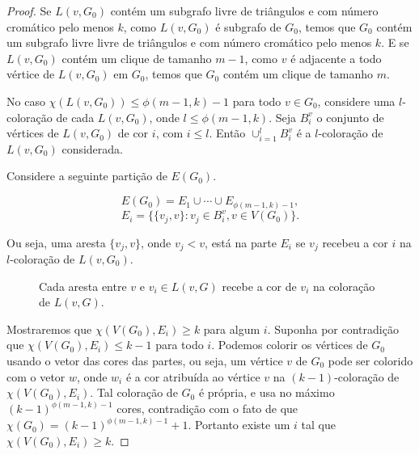\begin{proof}
Se $L(v, G_0)$ contém um subgrafo livre de triângulos e com número cromático pelo menos $k$, como $L(v,G_0)$ é subgrafo de $G_0$, temos que $G_0$ contém um subgrafo livre livre de triângulos e com número cromático pelo menos $k$. E se $L(v, G_0)$ contém um clique de tamanho $m-1$, como $v$ é adjacente a todo vértice de $L(v, G_0)$ em $G_0$, temos que $G_0$ contém um clique de tamanho $m$.

No caso $\chi(L(v,G_0)) \leq \phi(m-1,k)-1$ para todo $v\in G_0$, considere uma $l$-coloração de cada $L(v, G_0)$, onde $l \leq \phi(m-1, k)$. Seja $B_i^v$ o conjunto de vértices de $L(v, G_0)$ de cor $i$, com $i \leq l$. Então $\cup_{i=1}^l B_i^v$ é a $l$-coloração de $L(v,G_0)$ considerada.

Considere a seguinte partição de $E(G_0)$.

\[E(G_0) = E_1 \cup \cdots \cup E_{\phi(m-1,k)-1},\]
\[E_i = \{\{v_j,v\} : v_j \in B_i^v, v\in V(G_0)\}.\]

Ou seja, uma aresta $\{v_j, v\}$, onde $v_j < v$, está na parte $E_i$ se $v_j$ recebeu a cor $i$ na $l$-coloração de $L(v, G_0)$.

\begin{figure}[H]
\centering
{}
\caption{Cada aresta entre $v$ e $v_i\in L(v,G)$ recebe a cor de $v_i$ na coloração de $L(v,G)$.}
\label{fig:trianglefree-edgecolor}
\end{figure}

Mostraremos que $\chi(V(G_0),E_i) \geq k$ para algum $i$. Suponha por contradição que  $\chi(V(G_0),E_i) \leq k-1$ para todo $i$. Podemos colorir os vértices de $G_0$ usando o vetor das cores das partes, ou seja, um vértice $v$ de $G_0$ pode ser colorido com o vetor $w$, onde $w_i$ é a cor atribuída ao vértice $v$ na $(k-1)$-coloração de $\chi(V(G_0),E_i)$. Tal coloração de $G_0$ é própria, e usa no máximo $(k-1)^{\phi(m-1,k)-1}$ cores, contradição com o fato de que $\chi(G_0) = (k-1)^{\phi(m-1,k)-1}+1$. Portanto existe um $i$ tal que $\chi(V(G_0), E_i) \geq k$.


\end{proof}
